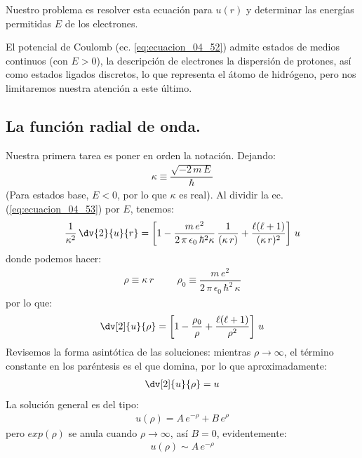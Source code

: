 Nuestro problema es resolver esta ecuación para $u(r)$ y determinar las energías permitidas $E$ de los electrones. 
\par
El potencial de Coulomb (ec. \ref{eq:ecuacion_04_52}) admite estados de medios continuos (con $E > 0$), la descripción de electrones la dispersión de protones, así como estados ligados discretos, lo que representa el átomo de hidrógeno, pero nos limitaremos nuestra atención a este último.

\subsection{La función radial de onda.}

Nuestra primera tarea es poner en orden la notación. Dejando:
\begin{align}
\kappa \equiv \dfrac{\sqrt{-2 \, m \, E}}{\hbar}
\label{eq:ecuacion_04_54}
\end{align}
(Para estados base, $E < 0$, por lo que $\kappa$ es real). Al dividir la ec. (\ref{eq:ecuacion_04_53}) por $E$, tenemos:
\begin{align*}
\dfrac{1}{\kappa^{2}} \, \dv{2}{u}{r} = \left[1 - \dfrac{m \, e^{2}}{2 \, \pi \, \epsilon_{0} \,\hbar^{2} \kappa} \, \dfrac{1}{(\kappa \, r)} + \dfrac{\ell (\ell + 1)}{(\kappa \, r)^{2}} \right] \, u
\end{align*}
donde podemos hacer:
\begin{align}
\rho \equiv \kappa \, r \hspace{1cm} \rho_{0} \equiv \dfrac{m \, e^{2}}{2 \, \pi \, \epsilon_{0} \, \hbar^{2} \, \kappa}
\label{eq:ecuacion_04_55}
\end{align}
por lo que:
\begin{align}
\dv[2]{u}{\rho} = \left[ 1 - \dfrac{\rho_{0}}{\rho} + \dfrac{\ell (\ell + 1)}{\rho^{2}} \right] \, u
\label{eq:ecuacion_04_56}
\end{align}
Revisemos la forma asintótica de las soluciones: mientras $\rho \to \infty$, el término constante en los paréntesis es el que domina, por lo que aproximadamente:
\begin{align*}
\dv[2]{u}{\rho} = u
\end{align*}
La solución general es del tipo:
\begin{align}
u(\rho) = A \, e^{-\rho} + B \, e^{\rho}
\label{eq:ecuacion_04_57}
\end{align}
pero $exp(\rho)$ se anula cuando $\rho \to \infty$, así $B = 0$, evidentemente:
\begin{align}
u(\rho) \sim A \, e^{-\rho}
\label{eq:ecuacion_04_58}
\end{align}
